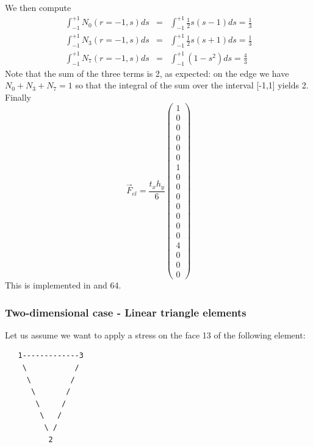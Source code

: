 We then compute
\begin{eqnarray}
\int_{-1}^{+1} N_0(r=-1,s) ds 
&=& \int_{-1}^{+1} \frac{1}{2}s(s-1) ds = \frac{1}{3} \\
\int_{-1}^{+1} N_3(r=-1,s) ds 
&=& \int_{-1}^{+1} \frac{1}{2}s(s+1) ds = \frac{1}{3} \\
\int_{-1}^{+1} N_7(r=-1,s) ds 
&=& \int_{-1}^{+1} (1-s^2) ds = \frac{4}{3} 
\end{eqnarray}
Note that the sum of the three terms is 2, as expected: on the edge
we have $N_0+N_3+N_7 =1$ so that the integral of the sum over the 
interval [-1,1] yields 2. Finally 
\[
\vec{F}_{el}
=
\frac{t_x  h_y}{6}
\left(
\begin{array}{c}
1 \\
0 \\
0 \\
0 \\
0 \\
0 \\
1 \\
0 \\
0 \\
0 \\
0 \\
0 \\
0 \\
0 \\
4 \\
0 \\
0 \\
0
\end{array}
\right)
\]
This is implemented in  and 64.








\subsubsection{Two-dimensional case - Linear triangle elements}

Let us assume we want to apply a stress on the face 13 of the following element:
\begin{verbatim}
   1-------------3
    \           /
     \         /
      \       /
       \     /
        \   /
         \ /
          2
\end{verbatim}

